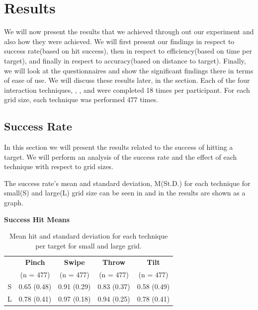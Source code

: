 \section{Results}
We will now present the results that we achieved through out our experiment and also how they were achieved. We will first present our findings in respect to success rate(based on hit success), then in respect to efficiency(based on time per target), and finally in respect to accuracy(based on distance to target). Finally, we will look at the questionnaires and show the significant findings there in terms of ease of use. We will discuss these results later, in the  section.  
Each of the four interaction techniques, \pinch, \swipe, \throw and \tilt were completed 18 times per participant. 
For each grid size, each technique was performed 477 times. 

\subsection{Success Rate}
In this section we will present the results related to the success of hitting a target.
We will perform an analysis of the success rate and the effect of each technique with respect to grid sizes.

The success rate's mean and standard deviation, M(St.D.) for each technique for small(S) and large(L) grid size can be seen in  and in  the results are shown as a graph.

\begin{table}[H]
	\centering
	\textbf{Success Hit Means}\\[4pt]
	\begin{adjustbox}{width=\columnwidth}
	\begin{tabular}{|c|c|c|c|c|}
			\hline
			\rowcolor[HTML]{9B9B9B} 
			& \textbf{Pinch} & \textbf{Swipe} & \textbf{Throw} & \textbf{Tilt} \\
			\rowcolor[HTML]{9B9B9B} 
			 & (n = 477) & (n = 477) & (n = 477) & (n = 477) \\ \hline
			S & 0.65 (0.48)       & 0.91 (0.29)         & 0.83 (0.37)         & 0.58 (0.49)        \\ \hline
			L & 0.78 (0.41)        & 0.97 (0.18)         & 0.94 (0.25)        & 0.78 (0.41)       \\ \hline
	\end{tabular}
	\end{adjustbox}
	\caption{Mean hit  and standard deviation for each technique per target for small and large grid.}
	\label{tab:meanHitTechnique}
\end{table}

